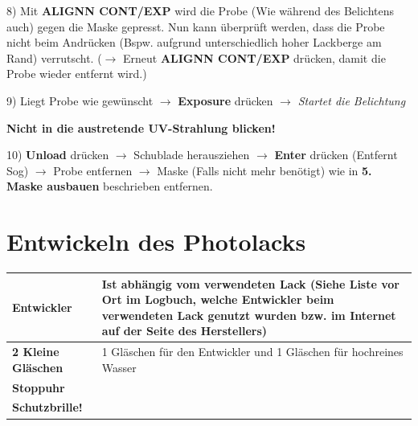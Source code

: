 \documentclass[
  ngerman,
  twoside,
  captions=tableheading,
  BCOR=.5cm,
  fontsize=11,
  ]{scrreprt}
\begin{document}
\begin{description}
\item 8) Mit \textbf{ALIGNN CONT/EXP} wird die Probe (Wie während des Belichtens auch) gegen die Maske gepresst. Nun kann überprüft werden, dass die Probe nicht beim Andrücken (Bspw. aufgrund unterschiedlich hoher Lackberge am Rand) verrutscht. ($\rightarrow$ Erneut \textbf{ALIGNN CONT/EXP} drücken, damit die Probe wieder entfernt wird.)

\item 9) Liegt Probe wie gewünscht $\rightarrow$ \textbf{Exposure} drücken $\rightarrow$ \textit{Startet die Belichtung}
\begin{center}
\textbf{Nicht in die austretende UV-Strahlung blicken!}
\end{center}

\item 10) \textbf{Unload} drücken $\rightarrow$ Schublade herausziehen $\rightarrow$ \textbf{Enter} drücken (Entfernt Sog) $\rightarrow$ Probe entfernen $\rightarrow$ Maske (Falls nicht mehr benötigt) wie in \textbf{5. Maske ausbauen} beschrieben entfernen.

\end{description}


\chapter{Entwickeln des Photolacks}

\begin{tabular}{| p{5cm} | p{10cm} |} \hline
\textbf{Entwickler} & Ist abhängig vom verwendeten Lack\newline
(Siehe Liste vor Ort im Logbuch, welche Entwickler beim verwendeten Lack genutzt wurden bzw. im Internet auf der Seite des Herstellers)\\ \hline
\textbf{2 Kleine Gläschen} & 1 Gläschen für den Entwickler und 1 Gläschen für hochreines Wasser\\ \hline
\textbf{Stoppuhr} & \\
\textbf{Schutzbrille!} & \\ \hline
\end{tabular}
\end{document}
